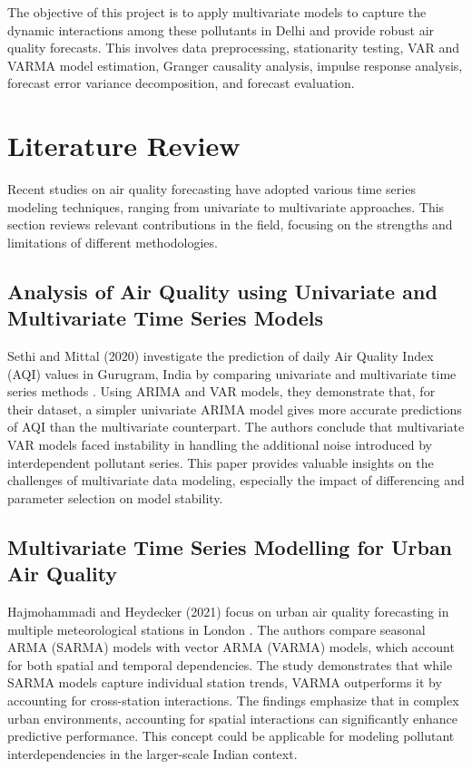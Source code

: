 \documentclass[fleqn,10pt]{SelfArx} %
\begin{document}
The objective of this project is to apply multivariate models to capture the dynamic interactions among these pollutants in Delhi and provide robust air quality forecasts. This involves data preprocessing, stationarity testing, VAR and VARMA model estimation, Granger causality analysis, impulse response analysis, forecast error variance decomposition, and forecast evaluation.


\section{Literature Review}
Recent studies on air quality forecasting have adopted various time series modeling techniques, ranging from univariate to multivariate approaches. This section reviews relevant contributions in the field, focusing on the strengths and limitations of different methodologies.

\subsection*{Analysis of Air Quality using Univariate and Multivariate Time Series Models}
Sethi and Mittal (2020) investigate the prediction of daily Air Quality Index (AQI) values in Gurugram, India by comparing univariate and multivariate time series methods \cite{sethi2020}. Using ARIMA and VAR models, they demonstrate that, for their dataset, a simpler univariate ARIMA model gives more accurate predictions of AQI than the multivariate counterpart. The authors conclude that multivariate VAR models faced instability in handling the additional noise introduced by interdependent pollutant series. This paper provides valuable insights on the challenges of multivariate data modeling, especially the impact of differencing and parameter selection on model stability.

\subsection*{Multivariate Time Series Modelling for Urban Air Quality}
Hajmohammadi and Heydecker (2021) focus on urban air quality forecasting in multiple meteorological stations in London \cite{hajmohammadi2021}. The authors compare seasonal ARMA (SARMA) models with vector ARMA (VARMA) models, which account for both spatial and temporal dependencies. The study demonstrates that while SARMA models capture individual station trends, VARMA outperforms it by accounting for cross-station interactions. The findings emphasize that in complex urban environments, accounting for spatial interactions can significantly enhance predictive performance. This concept could be applicable for modeling pollutant interdependencies in the larger-scale Indian context.
\end{document}
